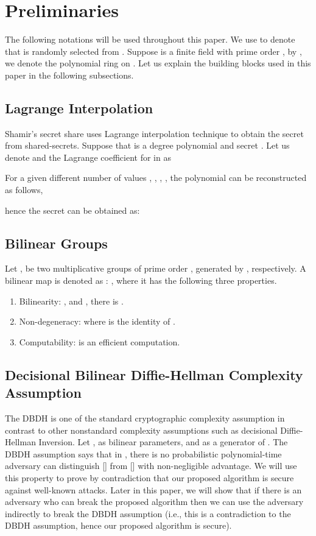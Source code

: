\documentclass[10pt,journal]{IEEEtran}
\begin{document}
\section{Preliminaries}
The following notations will be used throughout this paper. We use  to denote that  is randomly selected from . Suppose  is a finite field with prime order , by , we denote the polynomial ring on . Let us explain the building blocks used in this paper in the following subsections.

\subsection{Lagrange Interpolation}
Shamir's secret share uses Lagrange interpolation technique to obtain the secret from shared-secrets. Suppose that  is a  degree polynomial and secret . Let us denote  and the Lagrange coefficient for  in  as

For a given  different number of values , , , , the polynomial  can be reconstructed as follows,

hence the secret  can be obtained as:



\subsection{Bilinear Groups}
Let ,  be two multiplicative groups of prime order , generated by  ,  respectively.
A bilinear map is denoted as  :    , where it has the following three properties.
\begin{enumerate}
  \item Bilinearity: , and , there is .
  \item Non-degeneracy:   where  is the identity of .
  \item Computability:  is an efficient computation.
\end{enumerate}


\subsection{Decisional Bilinear Diffie-Hellman Complexity Assumption}
The DBDH  is one of the standard cryptographic complexity assumption in contrast to other nonstandard complexity assumptions such as decisional Diffie-Hellman Inversion. Let ,  as bilinear parameters, and  as a generator of . The DBDH assumption says that in , there is no probabilistic polynomial-time adversary can distinguish []  from [] with non-negligible advantage. We will use this property to prove by contradiction  that our proposed algorithm is secure against well-known attacks. Later in this paper, we will show that if there is an adversary who can break the proposed algorithm then we can use the adversary indirectly to break the DBDH assumption (i.e., this is a contradiction to the DBDH assumption, hence our proposed algorithm is secure).
\end{document}
